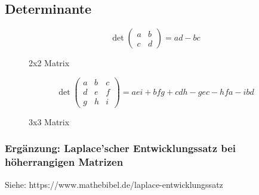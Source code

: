\subsection{Determinante}
\begin{figure}[H]
    \begin{equation}
        \det\begin{pmatrix}
        a & b \\
        c & d
        \end{pmatrix}
        = ad - bc
    \end{equation}
    \caption*{2x2 Matrix}
\end{figure}

\begin{figure}[H]
    \begin{equation}
        \det\begin{pmatrix}
        a & b & c \\
        d & e & f \\
        g & h & i
        \end{pmatrix}
        = aei + bfg + cdh - gec - hfa - ibd
    \end{equation}
    \caption*{3x3 Matrix}
\end{figure}

\subsubsection*{Ergänzung: Laplace'scher Entwicklungssatz bei höherrangigen Matrizen}
Siehe: https://www.mathebibel.de/laplace-entwicklungssatz